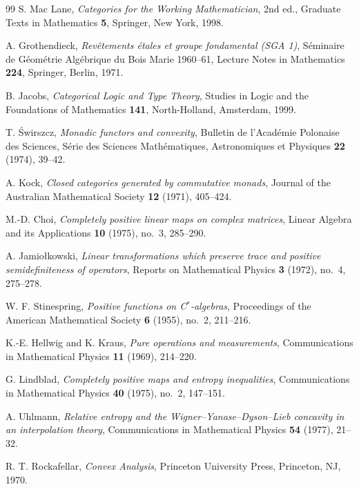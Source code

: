 \documentclass[11pt]{article}
\begin{document}
\begin{thebibliography}{99}
S. Mac Lane, \emph{Categories for the Working Mathematician}, 2nd ed.,
Graduate Texts in Mathematics \textbf{5}, Springer, New York, 1998.

A. Grothendieck, \emph{Rev\^etements \'etales et groupe fondamental
(SGA 1)}, S\'eminaire de G\'eom\'etrie Alg\'ebrique du Bois Marie
1960--61, Lecture Notes in Mathematics \textbf{224}, Springer, Berlin,
1971.

B. Jacobs, \emph{Categorical Logic and Type Theory}, Studies in Logic and
the Foundations of Mathematics \textbf{141}, North-Holland, Amsterdam,
1999.

T. \'Swirszcz, \emph{Monadic functors and convexity}, Bulletin de
l'Acad\'emie Polonaise des Sciences, S\'erie des Sciences
Math\'ematiques, Astronomiques et Physiques \textbf{22} (1974), 39--42.

A. Kock, \emph{Closed categories generated by commutative monads}, Journal
of the Australian Mathematical Society \textbf{12} (1971), 405--424.

M.-D. Choi, \emph{Completely positive linear maps on complex matrices},
Linear Algebra and its Applications \textbf{10} (1975), no.~3, 285--290.

A. Jamio\l{}kowski, \emph{Linear transformations which preserve trace and
positive semidefiniteness of operators}, Reports on Mathematical Physics
\textbf{3} (1972), no.~4, 275--278.

W. F. Stinespring, \emph{Positive functions on C$^*$-algebras},
Proceedings of the American Mathematical Society \textbf{6} (1955), no.~2,
211--216.

K.-E. Hellwig and K. Kraus, \emph{Pure operations and measurements},
Communications in Mathematical Physics \textbf{11} (1969), 214--220.

G. Lindblad, \emph{Completely positive maps and entropy inequalities},
Communications in Mathematical Physics \textbf{40} (1975), no.~2,
147--151.

A. Uhlmann, \emph{Relative entropy and the
Wigner--Yanase--Dyson--Lieb concavity in an interpolation theory},
Communications in Mathematical Physics \textbf{54} (1977), 21--32.

R. T. Rockafellar, \emph{Convex Analysis}, Princeton University Press,
Princeton, NJ, 1970.


\end{thebibliography}
\end{document}
